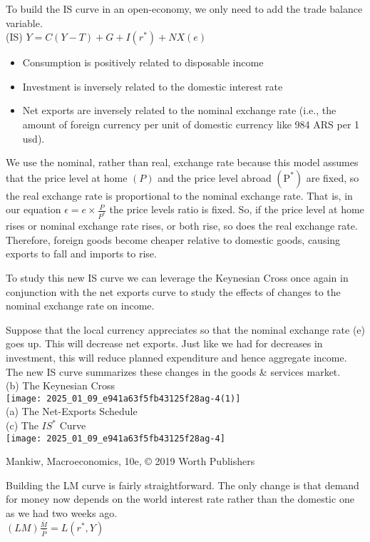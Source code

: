 \documentclass[10pt]{article}
\begin{document}
To build the IS curve in an open-economy, we only need to add the trade balance variable.\\
(IS) $Y=C(Y-T)+G+I\left(r^{*}\right)+N X(e)$

\begin{itemize}
  \item Consumption is positively related to disposable income
  \item Investment is inversely related to the domestic interest rate
  \item Net exports are inversely related to the nominal exchange rate (i.e., the amount of foreign currency per unit of domestic currency like 984 ARS per 1 usd).
\end{itemize}

We use the nominal, rather than real, exchange rate because this model assumes that the price level at home $(P)$ and the price level abroad $\left(\mathrm{P}^{*}\right)$ are fixed, so the real exchange rate is proportional to the nominal exchange rate. That is, in our equation $\epsilon=e \times \frac{P}{P^{*}}$ the price levels ratio is fixed. So, if the price level at home rises or nominal exchange rate rises, or both rise, so does the real exchange rate. Therefore, foreign goods become cheaper relative to domestic goods, causing exports to fall and imports to rise.

To study this new IS curve we can leverage the Keynesian Cross once again in conjunction with the net exports curve to study the effects of changes to the nominal exchange rate on income.

Suppose that the local currency appreciates so that the nominal exchange rate (e) goes up. This will decrease net exports. Just like we had for decreases in investment, this will reduce planned expenditure and hence aggregate income. The new IS curve summarizes these changes in the goods \& services market.\\
(b) The Keynesian Cross\\
\texttt{[image: 2025\_01\_09\_e941a63f5fb43125f28ag-4(1)]}\\
(a) The Net-Exports Schedule\\
(c) The $I S^{*}$ Curve\\
\texttt{[image: 2025\_01\_09\_e941a63f5fb43125f28ag-4]}

Mankiw, Macroeconomics, 10e, © 2019 Worth Publishers

Building the LM curve is fairly straightforward. The only change is that demand for money now depends on the world interest rate rather than the domestic one as we had two weeks ago.\\
$(L M) \frac{\bar{M}}{\bar{P}}=L\left(r^{*}, Y\right)$
\end{document}
